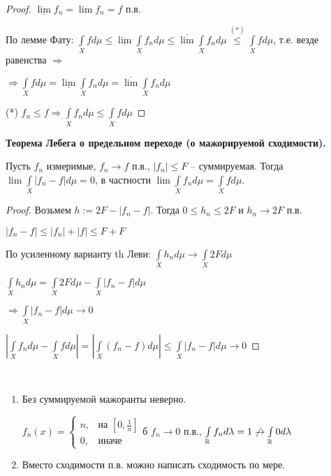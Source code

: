 \begin{proof}
    $\underline{\lim} f_n = \lim f_n = f$ п.в.

    По лемме Фату: $\int\limits_X f d\mu \leq \underline{\lim} \int\limits_X f_n d\mu \leq 
    \overline{\lim} \int\limits_X f_n d\mu\overset{(*)}{\leq} \int\limits_X f d\mu$, т.е. везде равенства $\Rightarrow$

    $\Rightarrow \int\limits_X f d\mu =\underline{\lim} \int\limits_X f_n d\mu = 
    \overline{\lim} \int\limits_X f_n d\mu$

    (*) $f_n \leq f \Rightarrow \int\limits_X f_n d\mu\leq \int\limits_X f d\mu $
\end{proof}

\begin{theorem}
    \textbf{Теорема Лебега о предельном переходе (о мажорируемой сходимости).}

    Пусть $f_n$ измеримые, $f_n\rightarrow f$ п.в., $|f_n|\leq F$ – суммируемая.
    Тогда $\lim \int\limits_X |f_n - f|d \mu = 0$,  в частности $\lim \int\limits_X f_n d\mu = \int\limits_X f d\mu$.
\end{theorem}

\begin{proof}
    Возьмем $h:= 2F - |f_n - f|$. Тогда $0\leq h_n \leq 2F$ и $h_n \rightarrow 2F$ п.в.

    $|f_n - f|\leq |f_n| + |f|\leq F + F$

    По усиленному варианту th Леви: $\int\limits_X h_n d\mu \rightarrow \int\limits_X 2F d\mu$

    $\int\limits_X h_n d\mu = \int\limits_X 2F d\mu-\int\limits_X |f_n - f| d\mu$

    $\Rightarrow \int\limits_X |f_n-f| d\mu\rightarrow 0$

    $|\int\limits_X f_n d\mu-\int\limits_X f d\mu|= |\int\limits_X (f_n - f) d\mu|\leq \int\limits_X |f_n-f| d\mu\rightarrow 0$
\end{proof}

\begin{remark}~
    \begin{enumerate}
        \item Без суммируемой мажоранты неверно.
        
        $f_n(x)=\left\{\begin{array}{ll}
            n, & \text{на } [0, \frac{1}{n}] \\
            0, & \text{иначе}
        \end{array}\right.$б $f_n\rightarrow 0$ п.в., $\int\limits_{\mathbb{R}} f_n d\lambda = 1\not \rightarrow\int\limits_{\mathbb{R}} 0 d\lambda$
        
        \item Вместо сходимости п.в. можно написать сходимость по мере.
    \end{enumerate}
\end{remark}

